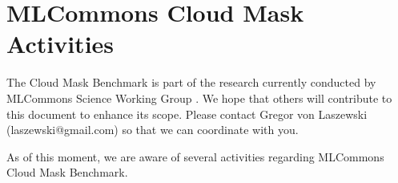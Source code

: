 \documentclass[sigplan,screen]{acmart}
\begin{document}

\maketitle


\section{MLCommons Cloud Mask Activities}

The Cloud Mask Benchmark is part of the research currently conducted by MLCommons \cite{Farrell2021MLPerfHA} Science Working Group \cite{www-mlcommons-science-github}. 
We hope that others will contribute to this 
document to enhance its scope. Please contact Gregor von Laszewski (laszewski@gmail.com) 
so that we can coordinate with you.

As of this moment, we are aware of several activities regarding MLCommons Cloud Mask Benchmark.
\end{document}

